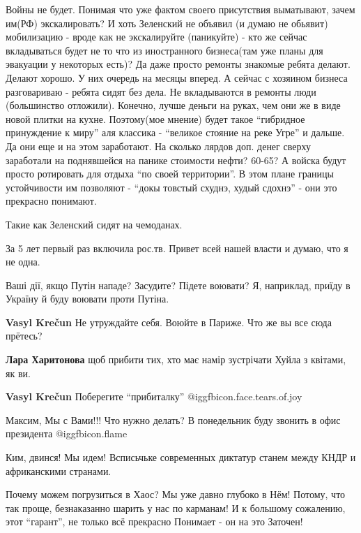 \begin{itemize}
Войны не будет. Понимая что уже фактом своего присутствия выматывают, зачем
им(РФ) экскалировать? И хоть Зеленский не объявил (и думаю не обьявит)
мобилизацию - вроде как не экскалируйте (паникуйте) - кто же сейчас вкладываться
будет не то что из иностранного бизнеса(там уже планы для эвакуации у некоторых
есть)? Да даже просто ремонты знакомые ребята делают. Делают хорошо. У них
очередь на месяцы вперед. А сейчас с хозяином бизнеса разговариваю - ребята
сидят без дела. Не вкладываются в ремонты люди (большинство отложили). Конечно,
лучше деньги на руках, чем они же в виде новой плитки на кухне. Поэтому(мое
мнение) будет такое \enquote{гибридное принуждение к миру} аля классика - \enquote{великое
стояние на реке Угре} и дальше. Да они еще и на этом заработают. На сколько
лярдов доп. денег сверху заработали на поднявшейся на панике стоимости нефти?
60-65? А войска будут просто ротировать для отдыха \enquote{по своей территории}. В
этом плане границы устойчивости им позволяют - \enquote{докы товстый схуднэ, худый
сдохнэ} - они это прекрасно понимают.

Такие как Зеленский сидят на чемоданах.


За 5 лет первый раз включила рос.тв. Привет всей нашей власти и думаю, что я не одна.


Ваші дії, якщо Путін нападе? Засудите? Підете воювати? Я, наприклад, приїду в
Україну й буду воювати проти Путіна.

\begin{itemize} %
\textbf{Vasyl Krečun} Не утруждайте себя. Воюйте в Париже. Что же вы все сюда прётесь?

\textbf{Лара Харитонова} щоб прибити тих, хто має намір зустрічати Хуйла з квітами, як ви.

\textbf{Vasyl Krečun} Поберегите \enquote{прибиталку}  @igg{fbicon.face.tears.of.joy} 
\end{itemize} %

Максим, Мы с Вами!!! Что нужно делать? В понедельник буду звонить в офис президента  @igg{fbicon.flame} 

Ким, двинся! Мы идем! Всписьчьке современных диктатур станем между КНДР и африканскими странами.


Почему можем погрузиться в Хаос? Мы уже давно глубоко в Нём! Потому, что так
проще, безнаказанно шарить у нас по карманам! И к большому сожалению, этот
\enquote{гарант}, не только всё прекрасно Понимает - он на это Заточен!


\end{itemize}
